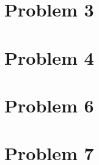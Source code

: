 



\lhead{}

\section{Problem 3}
  
\section{Problem 4}
  
\section{Problem 6}

\section{Problem 7}
  





